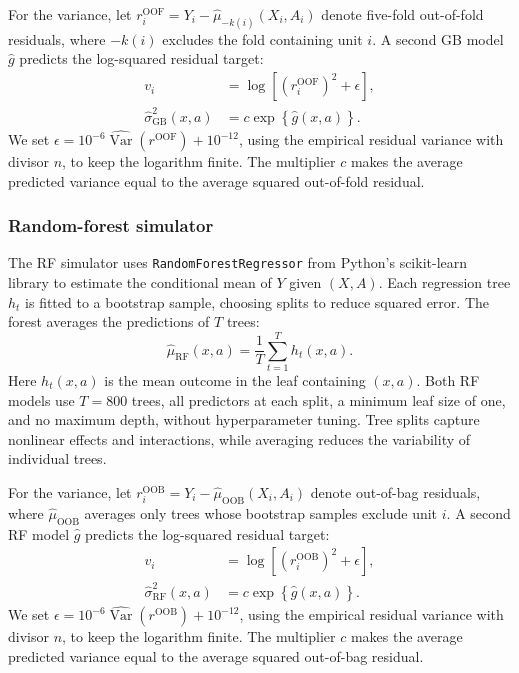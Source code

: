 For the variance, let \(r_i^{\mathrm{OOF}}=Y_i-\widehat\mu_{-k(i)}(X_i,A_i)\) denote five-fold out-of-fold residuals, where \(-k(i)\) excludes the fold containing unit \(i\). A second GB model \(\widehat g\) predicts the log-squared residual target:
\[
\begin{aligned}
v_i &= \log\!\left[(r_i^{\mathrm{OOF}})^2+\epsilon\right],\\
\widehat\sigma_{\mathrm{GB}}^2(x,a) &= c\exp\!\left\{\widehat g(x,a)\right\}.
\end{aligned}
\]
We set \(\epsilon=10^{-6}\widehat{\operatorname{Var}}(r^{\mathrm{OOF}})+10^{-12}\), using the empirical residual variance with divisor \(n\), to keep the logarithm finite. The multiplier \(c\) makes the average predicted variance equal to the average squared out-of-fold residual.

\subsubsection{Random-forest simulator}

The RF simulator uses \texttt{RandomForestRegressor} from Python's scikit-learn library to estimate the conditional mean of \(Y\) given \((X,A)\). Each regression tree \(h_t\) is fitted to a bootstrap sample, choosing splits to reduce squared error. The forest averages the predictions of \(T\) trees:
\[
\widehat\mu_{\mathrm{RF}}(x,a)
=\frac{1}{T}\sum_{t=1}^{T}h_t(x,a).
\]
Here \(h_t(x,a)\) is the mean outcome in the leaf containing \((x,a)\). Both RF models use \(T=800\) trees, all predictors at each split, a minimum leaf size of one, and no maximum depth, without hyperparameter tuning. Tree splits capture nonlinear effects and interactions, while averaging reduces the variability of individual trees.

For the variance, let \(r_i^{\mathrm{OOB}}=Y_i-\widehat\mu_{\mathrm{OOB}}(X_i,A_i)\) denote out-of-bag residuals, where \(\widehat\mu_{\mathrm{OOB}}\) averages only trees whose bootstrap samples exclude unit \(i\). A second RF model \(\widehat g\) predicts the log-squared residual target:
\[
\begin{aligned}
v_i &= \log\!\left[(r_i^{\mathrm{OOB}})^2+\epsilon\right],\\
\widehat\sigma_{\mathrm{RF}}^2(x,a) &= c\exp\!\left\{\widehat g(x,a)\right\}.
\end{aligned}
\]
We set \(\epsilon=10^{-6}\widehat{\operatorname{Var}}(r^{\mathrm{OOB}})+10^{-12}\), using the empirical residual variance with divisor \(n\), to keep the logarithm finite. The multiplier \(c\) makes the average predicted variance equal to the average squared out-of-bag residual.

